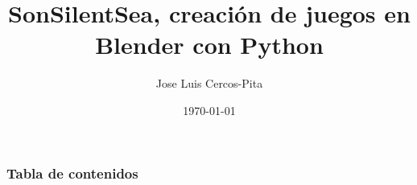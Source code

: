 \documentclass[8pt,compress]{beamer}
\begin{document}
\title{SonSilentSea, creación de juegos en Blender con Python}  
\author{Jose Luis Cercos-Pita}
\date{\today} 

\begin{frame}
\titlepage
\end{frame}

\begin{frame} \frametitle{Tabla de contenidos}
\tableofcontents
\end{frame} 


















\end{document}
